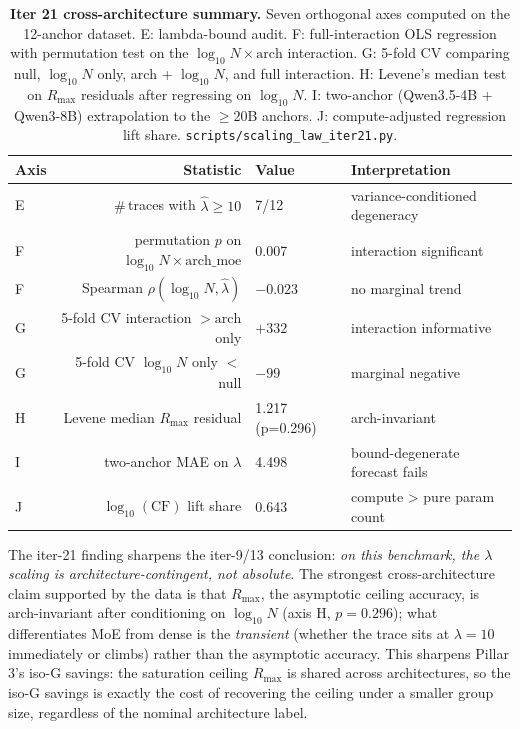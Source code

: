 \documentclass{article}
\begin{document}
\begin{table}[t]
  \centering
  \small
  \begin{tabular}{lrll}
    \toprule
    Axis & Statistic & Value & Interpretation \\
    \midrule
    E & $\#$\,traces with $\hat\lambda \ge 10$ & 7/12 & variance-conditioned degeneracy \\
    F & permutation $p$ on $\log_{10}N\!\times\!\mathrm{arch\_moe}$ & 0.007 & interaction significant \\
    F & Spearman $\rho(\log_{10}N,\hat\lambda)$ & $-0.023$ & no marginal trend \\
    G & 5-fold CV interaction $>\!\mathrm{arch}$ only & $+332$ & interaction informative \\
    G & 5-fold CV $\log_{10}N$ only $<$ null & $-99$ & marginal negative \\
    H & Levene median $R_{\max}$ residual & 1.217 (p=0.296) & arch-invariant \\
    I & two-anchor MAE on $\lambda$ & 4.498 & bound-degenerate forecast fails \\
    J & $\log_{10}(\mathrm{CF})$ lift share & 0.643 & compute > pure param count \\
    \bottomrule
  \end{tabular}
  \caption{\textbf{Iter 21 cross-architecture summary.}
    Seven orthogonal axes computed on the 12-anchor dataset.
    E: lambda-bound audit.  F: full-interaction OLS regression with
    permutation test on the $\log_{10}N\!\times\!\mathrm{arch}$
    interaction.  G: 5-fold CV comparing null, $\log_{10}N$ only,
    arch + $\log_{10}N$, and full interaction.  H: Levene's median test
    on $R_{\max}$ residuals after regressing on $\log_{10}N$.
    I: two-anchor (Qwen3.5-4B + Qwen3-8B) extrapolation to the
    $\ge 20$B anchors.  J: compute-adjusted regression lift share.
    \texttt{scripts/scaling\_law\_iter21.py}.}
  \label{tab:scaling-iter21-summary}
\end{table}

The iter-21 finding sharpens the iter-9/13 conclusion:
\emph{on this benchmark, the $\lambda$ scaling is
architecture-contingent, not absolute}.  The strongest
cross-architecture claim supported by the data is that
$R_{\max}$, the asymptotic ceiling accuracy, is
arch-invariant after conditioning on $\log_{10}N$ (axis H,
$p = 0.296$); what differentiates MoE from dense is the
\emph{transient} (whether the trace sits at $\lambda=10$
immediately or climbs) rather than the asymptotic accuracy.
This sharpens Pillar 3's iso-G savings: the saturation
ceiling $R_{\max}$ is shared across architectures, so the
iso-G savings is exactly the cost of recovering the
ceiling under a smaller group size, regardless of the
nominal architecture label.
\end{document}
